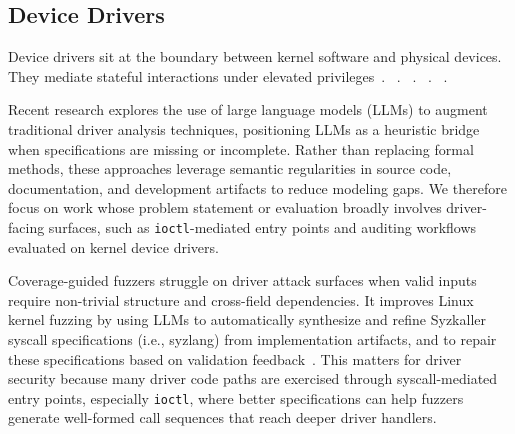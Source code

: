 \subsection{\textbf{Device Drivers}}
\label{sec:os:driver}

Device drivers sit at the boundary between kernel software and physical devices.
They mediate stateful interactions under elevated privileges~\cite{swift2003improving}.
~.
~.
~. ~.

Recent research explores the use of large language models (LLMs) to augment traditional driver analysis techniques, positioning LLMs as a heuristic bridge when specifications are missing or incomplete.
Rather than replacing formal methods, these approaches leverage semantic regularities in source code, documentation, and development artifacts to reduce modeling gaps.
We therefore focus on work whose problem statement or evaluation broadly involves driver-facing surfaces, such as \texttt{ioctl}-mediated entry points and auditing workflows evaluated on kernel device drivers.

\textbf{}
Coverage-guided fuzzers struggle on driver attack surfaces when valid inputs require non-trivial structure and cross-field dependencies.
It improves Linux kernel fuzzing by using LLMs to automatically synthesize and refine Syzkaller syscall specifications (i.e., syzlang) from implementation artifacts, and to repair these specifications based on validation feedback~.
This matters for driver security because many driver code paths are exercised through syscall-mediated entry points, especially \texttt{ioctl}, where better specifications can help fuzzers generate well-formed call sequences that reach deeper driver handlers.

